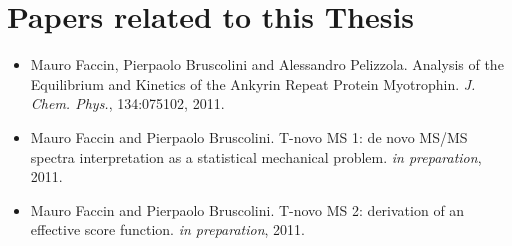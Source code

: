 \chapter{Papers related to this Thesis}


\begin{itemize}
\item 
Mauro Faccin, Pierpaolo Bruscolini and Alessandro Pelizzola.
Analysis of the Equilibrium and Kinetics of the Ankyrin Repeat Protein
Myotrophin.
\textit{ J. Chem. Phys.},
134:075102,
2011.
\item 
Mauro Faccin and Pierpaolo Bruscolini.
T-novo MS 1: de novo MS/MS spectra interpretation as a statistical mechanical
problem.
\textit{ in preparation},
2011.
\item 
Mauro Faccin and Pierpaolo Bruscolini.
T-novo MS 2: derivation of an effective score function.
\textit{ in preparation},
2011.
\end{itemize}
